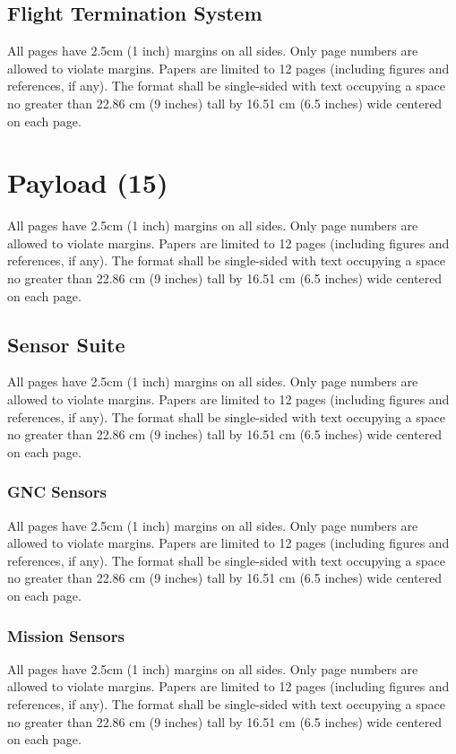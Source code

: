 \documentclass[12pt, letterpaper]{article}
\begin{document}
\subsection{Flight Termination System}
All pages have 2.5cm (1 inch) margins on all sides. Only page numbers are allowed to violate margins. Papers are limited to 12 pages (including figures and references, if any). The format shall be single-sided with text occupying a space no greater than 22.86 cm (9 inches) tall by 16.51 cm (6.5 inches) wide centered on each page.


\section{Payload (15)}
All pages have 2.5cm (1 inch) margins on all sides. Only page numbers are allowed to violate margins. Papers are limited to 12 pages (including figures and references, if any). The format shall be single-sided with text occupying a space no greater than 22.86 cm (9 inches) tall by 16.51 cm (6.5 inches) wide centered on each page.

\subsection{Sensor Suite}
All pages have 2.5cm (1 inch) margins on all sides. Only page numbers are allowed to violate margins. Papers are limited to 12 pages (including figures and references, if any). The format shall be single-sided with text occupying a space no greater than 22.86 cm (9 inches) tall by 16.51 cm (6.5 inches) wide centered on each page.

\subsubsection{GNC Sensors}
All pages have 2.5cm (1 inch) margins on all sides. Only page numbers are allowed to violate margins. Papers are limited to 12 pages (including figures and references, if any). The format shall be single-sided with text occupying a space no greater than 22.86 cm (9 inches) tall by 16.51 cm (6.5 inches) wide centered on each page.

\subsubsection{Mission Sensors}
All pages have 2.5cm (1 inch) margins on all sides. Only page numbers are allowed to violate margins. Papers are limited to 12 pages (including figures and references, if any). The format shall be single-sided with text occupying a space no greater than 22.86 cm (9 inches) tall by 16.51 cm (6.5 inches) wide centered on each page.
\end{document}
